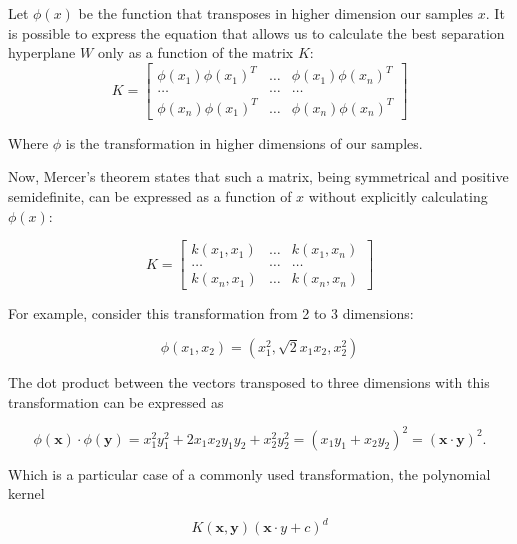 \documentclass[a4paper]{report}
\begin{document}
Let $\phi (x)$ be the function that transposes in higher dimension our samples $x$. It is possible to express the equation that allows us to calculate the best separation hyperplane $W$ only as a function of the matrix $K$:
\begin{equation}
K =
	\begin{bmatrix}
		\phi (x_1) \phi(x_1)^T & \ldots & \phi (x_1) \phi(x_n)^T \\
		\ldots                 & \ldots & \ldots \\
		\phi (x_n) \phi(x_1)^T & \ldots & \phi (x_n) \phi(x_n)^T
	\end{bmatrix}
\end{equation}	

Where $\phi$ is the transformation in higher dimensions of our samples.

Now, Mercer's theorem states that such a matrix, being symmetrical and positive semidefinite, can be expressed as a function of $x$ without explicitly calculating $\phi (x)$: 

\begin{equation}
K =
\begin{bmatrix}
	k(x_1, x_1) & \ldots & k(x_1, x_n) \\
	\ldots                 & \ldots & \ldots \\
	k(x_n, x_1) & \ldots & k(x_n, x_n)
\end{bmatrix}
\end{equation}

For example, consider this transformation from 2 to 3 dimensions:

\begin{equation}
	\phi (x_1, x_2) = (x_1^2, \sqrt 2 x_1x_2, x_2^2)
\end{equation}

The dot product between the vectors transposed to three dimensions with this transformation can be expressed as

\begin{equation}
	\phi(\textbf{x}) \cdot \phi(\textbf{y}) = x_1^2y_1^2 + 2x_1x_2y_1y_2 + x_2^2y_2^2 = (x_1y_1+x_2y_2)^2 = (\textbf{x} \cdot \textbf{y})^2.
\end{equation}

Which is a particular case of a commonly used transformation, the polynomial kernel

\begin{equation}
	K(\textbf{x},\textbf{y})(\textbf{x}\cdot{y}+c)^d
\end{equation}
\end{document}

